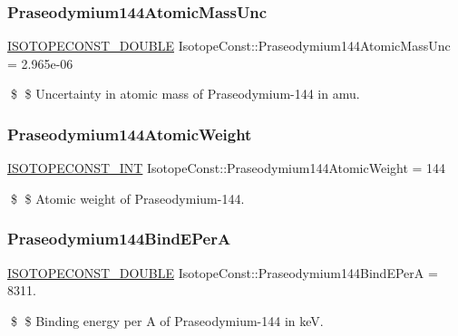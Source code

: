 \subsubsection{\texorpdfstring{Praseodymium144\+Atomic\+Mass\+Unc}{Praseodymium144AtomicMassUnc}}
{\footnotesize\ttfamily \mbox{\hyperlink{group___isotope_const-_macros_ga8f45a7272ce02c0b4c65c44636ed719a}{I\+S\+O\+T\+O\+P\+E\+C\+O\+N\+S\+T\+\_\+\+D\+O\+U\+B\+LE}} Isotope\+Const\+::\+Praseodymium144\+Atomic\+Mass\+Unc = 2.\+965e-\/06}

\$ \$ Uncertainty in atomic mass of Praseodymium-\/144 in amu. \mbox{\label{group___isotope_const-_praseodymium-_pr144_gad3cda3942d553b9290f0697bbf187dae}} 
\subsubsection{\texorpdfstring{Praseodymium144\+Atomic\+Weight}{Praseodymium144AtomicWeight}}
{\footnotesize\ttfamily \mbox{\hyperlink{group___isotope_const-_macros_ga5f18360b3e99483a35c32d789e62621c}{I\+S\+O\+T\+O\+P\+E\+C\+O\+N\+S\+T\+\_\+\+I\+NT}} Isotope\+Const\+::\+Praseodymium144\+Atomic\+Weight = 144}

\$ \$ Atomic weight of Praseodymium-\/144. \mbox{\label{group___isotope_const-_praseodymium-_pr144_ga862854b39c067065a807a1b33b38b778}} 
\subsubsection{\texorpdfstring{Praseodymium144\+Bind\+E\+PerA}{Praseodymium144BindEPerA}}
{\footnotesize\ttfamily \mbox{\hyperlink{group___isotope_const-_macros_ga8f45a7272ce02c0b4c65c44636ed719a}{I\+S\+O\+T\+O\+P\+E\+C\+O\+N\+S\+T\+\_\+\+D\+O\+U\+B\+LE}} Isotope\+Const\+::\+Praseodymium144\+Bind\+E\+PerA = 8311.}

\$ \$ Binding energy per A of Praseodymium-\/144 in keV. \mbox{\label{group___isotope_const-_praseodymium-_pr144_ga6665f32df8efb40add788643c4033458}} 
